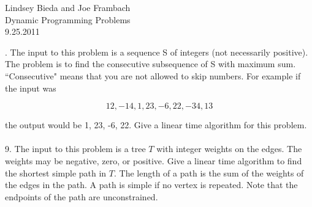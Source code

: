 \documentclass[10pt]{article}
\begin{document}
	\begin{flushright}
	Lindsey Bieda and Joe Frambach\\
	Dynamic Programming Problems\\
	9.25.2011
	\end{flushright}
	.  The input to this problem is a sequence S of integers (not necessarily positive). The problem is to find
			the consecutive subsequence of S with maximum sum. ``Consecutive" means that you are not allowed
			to skip numbers. For example if the input was
			
			\[ 12, -14, 1, 23, -6, 22, -34, 13 \]
			
			\noindent
			the output would be 1, 23, -6, 22. Give a linear time algorithm for this problem.\\
			\\
	9.	The input to this problem is a tree $T$ with integer weights on the edges. The weights may be negative,
			zero, or positive.  Give a linear time algorithm to find the shortest simple path in $T$.  The length of a
			path is the sum of the weights of the edges in the path. A path is simple if no vertex is repeated. Note
			that the endpoints of the path are unconstrained.\\
			\\
\end{document}
